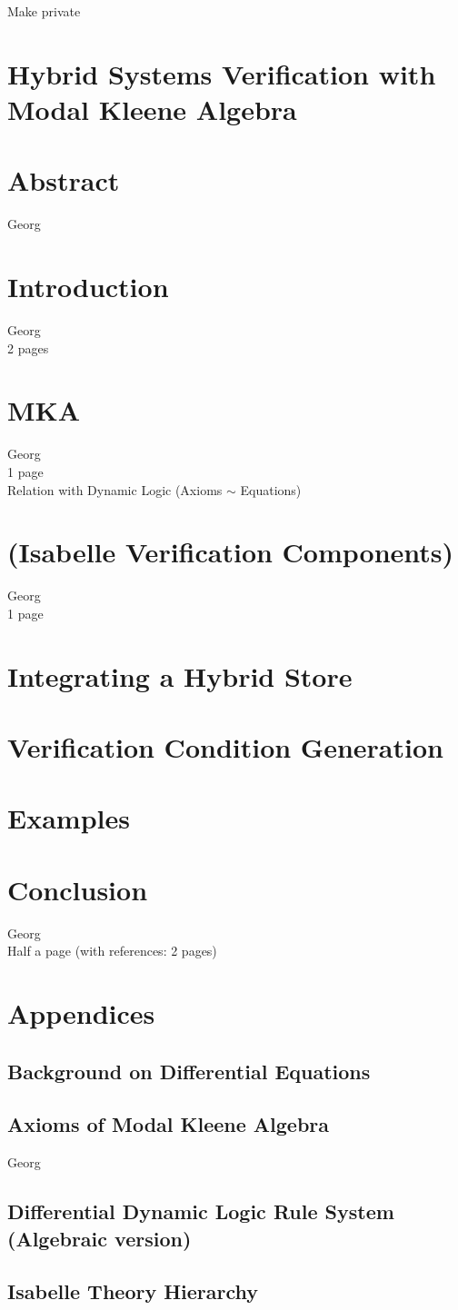 \documentclass[english,letterpaper,12pt]{article} %
\theoremstyle{JnthnThm}		%
\theoremstyle{JnthnExmp}		%
\begin{document}
		Make private
		\section{Hybrid Systems Verification with Modal Kleene Algebra}
		\section{Abstract}
		Georg\\

		\section{Introduction}
		Georg\\

		2 pages
		\section{MKA} %
		Georg\\
		1 page\\
		Relation with Dynamic Logic (Axioms $\sim$ Equations)

		\section{(Isabelle Verification Components)}
		Georg\\
		1 page
		\section{Integrating a Hybrid Store} %
		\section{Verification Condition Generation}%
		\section{Examples}
		\section{Conclusion}
		Georg\\
		Half a page (with references: 2 pages)
		\section{Appendices}
		\subsection{Background on Differential Equations}
		\subsection{Axioms of Modal Kleene Algebra}
		Georg\\
		\subsection{Differential Dynamic Logic Rule System (Algebraic version)}
		\subsection{Isabelle Theory Hierarchy}

	
\end{document}
